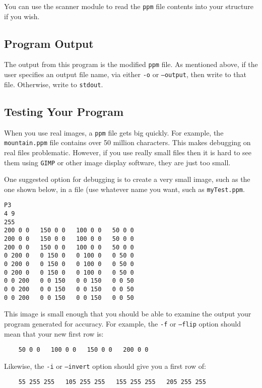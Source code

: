 \documentclass[12pt]{article}
\begin{document}
You can use the scanner module to read the {\tt ppm} file contents into your
structure if you wish.

\subsection*{Program Output}

The output from this program is the modified {\tt ppm} file.  As
mentioned above, if the user
specifies an output file name, via either {\tt -o} or {\tt --output}, then
write to that file.  Otherwise, write to {\tt stdout}.

\subsection*{Testing Your Program}

When you use real images, a {\tt ppm} file gets big quickly.  For example,
the {\tt mountain.ppm} file contains over 50 million characters.  This makes
debugging on real files problematic.  However, if you use really small files
then it is hard to see them using {\tt GIMP} or other image display software,
they are just too small.

One suggested option for debugging is to create a very small image, such
as the one shown below, in a file (use whatever name you want, such as
{\tt myTest.ppm}.

\begin{verbatim}
P3
4 9
255
200 0 0   150 0 0   100 0 0   50 0 0
200 0 0   150 0 0   100 0 0   50 0 0
200 0 0   150 0 0   100 0 0   50 0 0
0 200 0   0 150 0   0 100 0   0 50 0
0 200 0   0 150 0   0 100 0   0 50 0
0 200 0   0 150 0   0 100 0   0 50 0
0 0 200   0 0 150   0 0 150   0 0 50
0 0 200   0 0 150   0 0 150   0 0 50
0 0 200   0 0 150   0 0 150   0 0 50
\end{verbatim}

This image is small enough that you should be able to examine the output
your program generated for accuracy.  For example, the {\tt -f} or {\tt --flip}
option should mean that your new first row is:

\begin{verbatim}
    50 0 0   100 0 0   150 0 0   200 0 0
\end{verbatim}

Likewise, the {\tt -i} or {\tt --invert} option should give you a first row of:

\begin{verbatim}
    55 255 255   105 255 255   155 255 255   205 255 255
\end{verbatim}
\end{document}
